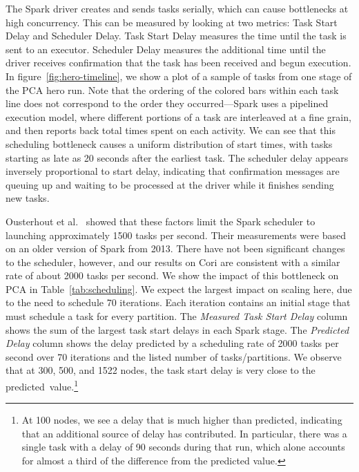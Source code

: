 The Spark driver creates and sends tasks serially, which can cause bottlenecks at high concurrency.  This can be measured by looking at two metrics: Task Start Delay and Scheduler Delay. Task Start Delay measures the time until the  task is sent to an executor. Scheduler Delay measures the additional time until the driver receives confirmation that the task has been received and begun execution.  In figure~\ref{fig:hero-timeline}, we show a plot of a sample of tasks from one stage of the PCA hero run.  Note that the ordering of the colored bars within each task line does not correspond to the order they occurred---Spark uses a pipelined execution model, where different portions of a task are interleaved at a fine grain, and then reports back total times spent on each activity.  We can see that this scheduling bottleneck causes a uniform distribution of start times, with tasks starting as late as 20 seconds after the earliest task.  The scheduler delay appears inversely proportional to start delay, indicating that confirmation messages are queuing up and waiting to be processed at the driver while it finishes sending new tasks.



Ousterhout et al.~\cite{Ousterhout13Sparrow} showed that these factors limit the Spark scheduler to launching approximately 1500 tasks per second.  Their measurements were based on an older version of Spark from 2013.  There have not been significant changes to the scheduler, however, and our results on Cori are consistent with a similar rate of about 2000 tasks per second.  We show the impact of this bottleneck on PCA in Table~\ref{tab:scheduling}.  
We expect the largest impact on scaling here, due to the need to schedule 70 iterations.  Each iteration contains an initial stage that must schedule a task for every partition.  The \emph{Measured Task Start Delay} column shows the sum of the largest task start delays in each Spark stage.  The \emph{Predicted Delay} column shows the delay predicted by a scheduling rate of 2000 tasks per second over 70 iterations and the listed number of tasks/partitions.  We observe that at 300, 500, and 1522 nodes, the task start delay is very close to the predicted~value.\footnote{At 100 nodes, we see a delay that is much higher than predicted, indicating that an additional source of delay has contributed.  In particular, there was a single task with a delay of 90 seconds during that run, which alone accounts for almost a third of the difference from the predicted value.}

